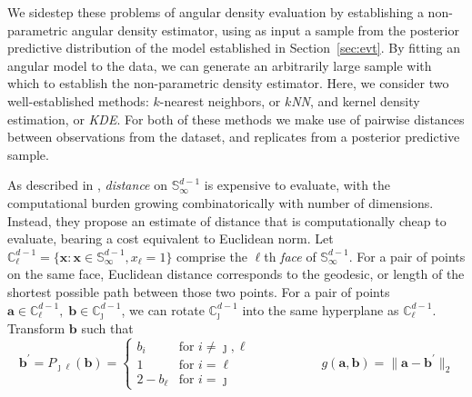 We sidestep these problems of angular density evaluation by establishing a 
    non-parametric angular density estimator, using as input a sample from the 
    posterior predictive distribution of the model established in 
    Section~\ref{sec:evt}. By fitting an angular model to the data, we can 
    generate an arbitrarily large sample with which to establish the 
    non-parametric density estimator.  Here, we consider two well-established
    methods: $k$-nearest neighbors, or \emph{$k$NN}, and 
    kernel density estimation, or \emph{KDE}.  For both of these methods we make
    use of pairwise distances between observations from the dataset, and
    replicates from a posterior predictive sample.  

As described in \cite{trubey:pg}, \emph{distance} on 
    $\mathbb{S}_{\infty}^{d-1}$ 
    is expensive to evaluate, with the computational burden growing 
    combinatorically with number of dimensions.  Instead, they propose an 
    estimate of distance that is computationally cheap to evaluate, bearing 
    a cost equivalent to Euclidean norm.  
    Let
    ${\mathbb C}_{\ell}^{d-1} = \lbrace \bm{x} : 
        \bm{x} \in {\mathbb S}_{\infty}^{d-1}, x_{\ell} = 1\rbrace$
    comprise the $\ell$th \emph{face} of $\mathbb{S}_{\infty}^{d-1}$.  For a 
    pair of points on the same face, Euclidean distance corresponds to the
    geodesic, or length of the shortest possible path between those two points.  
    For a pair of points 
    $\bm{a} \in \mathbb{C}_{\ell}^{d-1},\;\bm{b}\in\mathbb{C}_{\jmath}^{d-1}$,
    we can rotate $\mathbb{C}_{\jmath}^{d-1}$ into the same hyperplane as 
    $\mathbb{C}_{\ell}^{d-1}$.  Transform $\bm{b}$ such that %
    \begin{equation}
        \label{eqn:rotation}
        \bm{b}^{\prime} = P_{\jmath\ell}(\bm{b}) = 
        \begin{cases}
            b_{i} &\text{for }i\neq \jmath,\ell\\
            1 &\text{for }i = \ell\\
            2 - b_{\ell} &\text{for }i = \jmath
        \end{cases}\;\hspace{2cm}\;
        g(\bm{a},\bm{b}) = \lVert \bm{a} - \bm{b}^{\prime}\rVert_2
    \end{equation}

